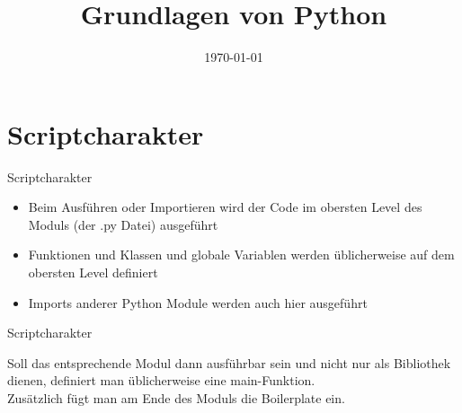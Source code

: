 

\usepackage{comment}

\newcommand{\topic}{
	Grundlagen von Python
}

\title{\topic}
\supertitle{\course}
\date{\today}



\maketitle

\begin{frame}
	\tableofcontents
\end{frame}



\section{Scriptcharakter}
\begin{frame}[fragile]{Scriptcharakter}
\begin{itemize}
	\item Beim Ausführen oder Importieren wird der Code im obersten Level des Moduls (der .py Datei) ausgeführt
	\item Funktionen und Klassen und globale Variablen werden üblicherweise auf dem obersten Level definiert
	\item Imports anderer Python Module werden auch hier ausgeführt
\end{itemize}
\end{frame}

\begin{frame}[fragile]{Scriptcharakter}

Soll das entsprechende Modul dann ausführbar sein und nicht nur als Bibliothek dienen, definiert man üblicherweise eine main-Funktion.\\
Zus\"atzlich f\"ugt man am Ende des Moduls die Boilerplate ein.\\
\end{frame}

